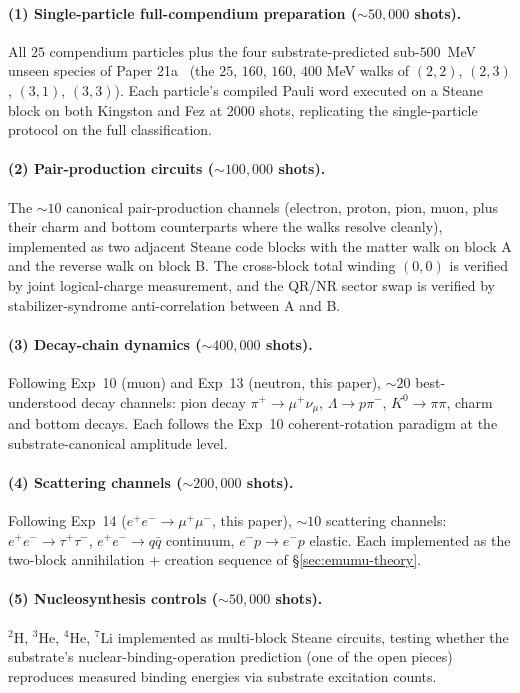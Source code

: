 \documentclass[11pt]{article}
\begin{document}
\paragraph{(1) Single-particle full-compendium preparation ($\sim 50{,}000$ shots).}
All $25$ compendium particles plus the four substrate-predicted sub-$500$~MeV unseen species of Paper 21a~\cite[\S 8.1]{Paper21a} (the $25$, $160$, $160$, $400$ MeV walks of $(2, 2)$, $(2, 3)$, $(3, 1)$, $(3, 3)$).  Each particle's compiled Pauli word executed on a Steane block on both Kingston and Fez at $2000$ shots, replicating the single-particle protocol on the full classification.

\paragraph{(2) Pair-production circuits ($\sim 100{,}000$ shots).}
The $\sim 10$ canonical pair-production channels (electron, proton, pion, muon, plus their charm and bottom counterparts where the walks resolve cleanly), implemented as two adjacent Steane code blocks with the matter walk on block A and the reverse walk on block B.  The cross-block total winding $(0, 0)$ is verified by joint logical-charge measurement, and the QR/NR sector swap is verified by stabilizer-syndrome anti-correlation between A and B.

\paragraph{(3) Decay-chain dynamics ($\sim 400{,}000$ shots).}
Following Exp~10 (muon) and Exp~13 (neutron, this paper), $\sim 20$ best-understood decay channels: pion decay $\pi^+ \to \mu^+ \nu_\mu$, $\Lambda \to p \pi^-$, $K^0 \to \pi\pi$, charm and bottom decays.  Each follows the Exp~10 coherent-rotation paradigm at the substrate-canonical amplitude level.

\paragraph{(4) Scattering channels ($\sim 200{,}000$ shots).}
Following Exp~14 ($e^+ e^- \to \mu^+ \mu^-$, this paper), $\sim 10$ scattering channels: $e^+ e^- \to \tau^+ \tau^-$, $e^+ e^- \to q \bar q$ continuum, $e^- p \to e^- p$ elastic.  Each implemented as the two-block annihilation $+$ creation sequence of \S\ref{sec:emumu-theory}.

\paragraph{(5) Nucleosynthesis controls ($\sim 50{,}000$ shots).}
$^{2}\text{H}$, $^{3}\text{He}$, $^{4}\text{He}$, $^{7}\text{Li}$ implemented as multi-block Steane circuits, testing whether the substrate's nuclear-binding-operation prediction (one of the open pieces) reproduces measured binding energies via substrate excitation counts.
\end{document}
